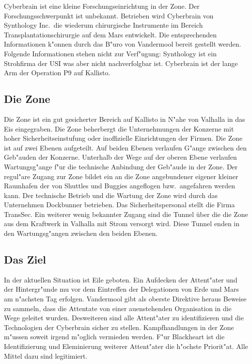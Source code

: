 \newcommand{\ml}{\pinyin{Mailin2}}

Cyberbrain ist eine kleine Forschungseinrichtung in der Zone. Der Forschungsschwerpunkt ist unbekannt. Betrieben wird Cyberbrain von Synthology Inc.~die wiederum chirurgische Instrumente im Bereich Transplantationschirurgie auf dem Mars entwickelt. Die entsprechenden Informationen k"onnen durch das B"uro von Vandermool bereit gestellt werden. Folgende Informationen stehen nicht zur Verf"ugung: Synthology ist ein Strohfirma der USI was aber nicht nachverfolgbar ist. Cyberbrain ist der lange Arm der Operation P9 auf Kallisto.

\subsection{Die Zone}
Die Zone ist ein gut gesicherter Bereich auf Kallisto in N"ahe von Valhalla in das Eis eingegraben. Die Zone beherbergt die Unternehmungen der Konzerne mit hoher Sicherheitseinstufung oder inoffizielle Einrichtungen der Firmen. Die Zone ist auf zwei Ebenen aufgeteilt. Auf beiden Ebenen verlaufen G"ange zwischen den Geb"auden der Konzerne. Unterhalb der Wege auf der oberen Ebene verlaufen Wartungsg"ange f"ur die technische Anbindung der Geb"aude in der Zone. Der regul"are Zugang zur Zone bildet ein an die Zone angebundener eigener kleiner Raumhafen der von Shuttles und Buggies angeflogen bzw.~angefahren werden kann. Der technische Betrieb und die Wartung der Zone wird durch das Unternehmen Dockbunner betrieben. Das Sicherheitspersonal stellt die Firma TransSec. Ein weiterer wenig bekannter Zugang sind die Tunnel über die die Zone aus dem Kraftwerk in Valhalla mit Strom versorgt wird. Diese Tunnel enden in den Wartungsg"angen zwischen den beiden Ebenen.

\subsection{Das Ziel} 
In der aktuellen Situation ist Eile geboten. Ein Aufdecken der Attent"ater und der Hintergr"unde mu\3 vor dem Eintreffen der Delegationen von Erde und Mars am n"achsten Tag erfolgen. Vandermool gibt als oberste Direktive heraus Beweise zu sammeln, dass die Attentate von einer au\3enstehenden Organisation in die Wege geleitet wurden. Desweiteren sind alle Attent"ater zu identifizieren und die Technologien der Cyberbrain sicher zu stellen. Kampfhandlungen in der Zone m"ussen soweit irgend m"oglich vermieden werden. F"ur Blackheart ist die Identifizierung und Eleminierung weiterer Attent"ater die h"ochste Priorit"at. Alle Mittel dazu sind legitimiert. 

